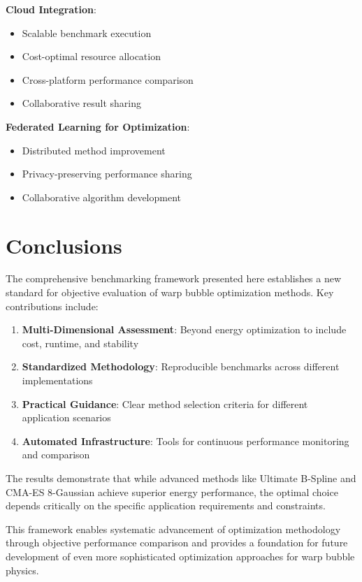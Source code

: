 \documentclass[11pt,a4paper]{article}
\begin{document}
\textbf{Cloud Integration}:
\begin{itemize}
\item Scalable benchmark execution
\item Cost-optimal resource allocation
\item Cross-platform performance comparison
\item Collaborative result sharing
\end{itemize}

\textbf{Federated Learning for Optimization}:
\begin{itemize}
\item Distributed method improvement
\item Privacy-preserving performance sharing
\item Collaborative algorithm development
\end{itemize}

\section{Conclusions}

The comprehensive benchmarking framework presented here establishes a new standard for objective evaluation of warp bubble optimization methods. Key contributions include:

\begin{enumerate}
\item \textbf{Multi-Dimensional Assessment}: Beyond energy optimization to include cost, runtime, and stability
\item \textbf{Standardized Methodology}: Reproducible benchmarks across different implementations
\item \textbf{Practical Guidance}: Clear method selection criteria for different application scenarios
\item \textbf{Automated Infrastructure}: Tools for continuous performance monitoring and comparison
\end{enumerate}

The results demonstrate that while advanced methods like Ultimate B-Spline and CMA-ES 8-Gaussian achieve superior energy performance, the optimal choice depends critically on the specific application requirements and constraints.

This framework enables systematic advancement of optimization methodology through objective performance comparison and provides a foundation for future development of even more sophisticated optimization approaches for warp bubble physics.
\end{document}
